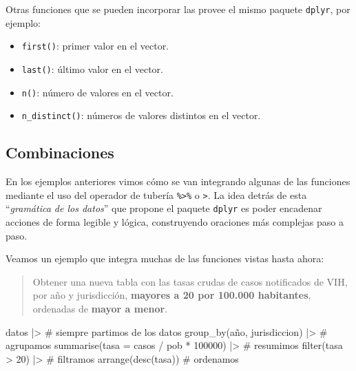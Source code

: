 \documentclass[
  spanish,
  a4paper,
]{scrbook}
\newenvironment{Shaded}{\begin{snugshade}}{\end{snugshade}}
\newcommand{\AttributeTok}[1]{\textcolor[rgb]{0.40,0.45,0.13}{#1}}
\newcommand{\CommentTok}[1]{\textcolor[rgb]{0.37,0.37,0.37}{#1}}
\newcommand{\DecValTok}[1]{\textcolor[rgb]{0.68,0.00,0.00}{#1}}
\newcommand{\FunctionTok}[1]{\textcolor[rgb]{0.28,0.35,0.67}{#1}}
\newcommand{\NormalTok}[1]{\textcolor[rgb]{0.00,0.23,0.31}{#1}}
\newcommand{\SpecialCharTok}[1]{\textcolor[rgb]{0.37,0.37,0.37}{#1}}
\providecommand{\tightlist}{%
  \setlength{\itemsep}{0pt}\setlength{\parskip}{0pt}}
\begin{document}
Otras funciones que se pueden incorporar las provee el mismo paquete
\texttt{dplyr}, por ejemplo:

\begin{itemize}
\tightlist
\item
  \texttt{first()}: primer valor en el vector.
\item
  \texttt{last()}: último valor en el vector.
\item
  \texttt{n()}: número de valores en el vector.
\item
  \texttt{n\_distinct()}: números de valores distintos en el vector.
\end{itemize}

\subsection{Combinaciones}\label{combinaciones}

En los ejemplos anteriores vimos cómo se van integrando algunas de las
funciones mediante el uso del operador de tubería
\texttt{\%\textgreater{}\%} o \texttt{\textbar{}\textgreater{}}. La idea
detrás de esta ``\emph{gramática de los datos}'' que propone el paquete
\texttt{dplyr} es poder encadenar acciones de forma legible y lógica,
construyendo oraciones más complejas paso a paso.

Veamos un ejemplo que integra muchas de las funciones vistas hasta
ahora:

\begin{quote}
Obtener una nueva tabla con las tasas crudas de casos notificados de
VIH, por año y jurisdicción, \textbf{mayores a 20 por 100.000
habitantes}, ordenadas de \textbf{mayor a menor}.
\end{quote}

\begin{Shaded}
\begin{Highlighting}[]
\NormalTok{datos }\SpecialCharTok{|\textgreater{}} \CommentTok{\# siempre partimos de los datos}
  \FunctionTok{group\_by}\NormalTok{(año, jurisdiccion) }\SpecialCharTok{|\textgreater{}} \CommentTok{\# agrupamos}
  \FunctionTok{summarise}\NormalTok{(}\AttributeTok{tasa =}\NormalTok{ casos }\SpecialCharTok{/}\NormalTok{ pob }\SpecialCharTok{*} \DecValTok{100000}\NormalTok{) }\SpecialCharTok{|\textgreater{}} \CommentTok{\# resumimos}
  \FunctionTok{filter}\NormalTok{(tasa }\SpecialCharTok{\textgreater{}} \DecValTok{20}\NormalTok{) }\SpecialCharTok{|\textgreater{}} \CommentTok{\# filtramos}
  \FunctionTok{arrange}\NormalTok{(}\FunctionTok{desc}\NormalTok{(tasa)) }\CommentTok{\# ordenamos}
\end{Highlighting}
\end{Shaded}
\end{document}
